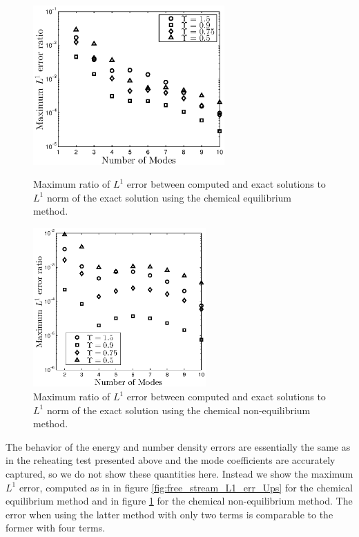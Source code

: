 \begin{figure}[H]
 \begin{minipage}[t]{0.5\linewidth}
\centerline{\includegraphics[height=6.1cm]{03-birrell/SpectralMethodBoltzmann/free_stream_L1_err_Ups.eps}}
\caption{Maximum ratio  of $L^1$ error between computed and exact solutions to $L^1$ norm of the exact solution using the chemical equilibrium method.}\label{fig:free_stream_L1_err_Ups}
 \end{minipage}
 \hspace{0.5cm}
 \begin{minipage}[t]{0.5\linewidth}
\centerline{\includegraphics[height=6.1cm]{03-birrell/SpectralMethodBoltzmann/k_eq_L1_err_Ups.eps}}
\caption{Maximum ratio of $L^1$ error between computed and exact solutions to $L^1$ norm of the exact solution using the chemical non-equilibrium method.}\label{fig:k_eq_L1_err_Ups}
 \end{minipage}
 \end{figure}


The behavior of the energy and number density errors are essentially the same as in the reheating test presented above and the mode coefficients are accurately captured, so we do not show these quantities here.  Instead  we show the maximum $L^1$ error, computed as in  in figure \ref{fig:free_stream_L1_err_Ups} for the chemical equilibrium method and in figure \ref{fig:k_eq_L1_err_Ups} for the chemical non-equilibrium method.  The error when using the latter method with only two terms is comparable to the former with four terms.  




